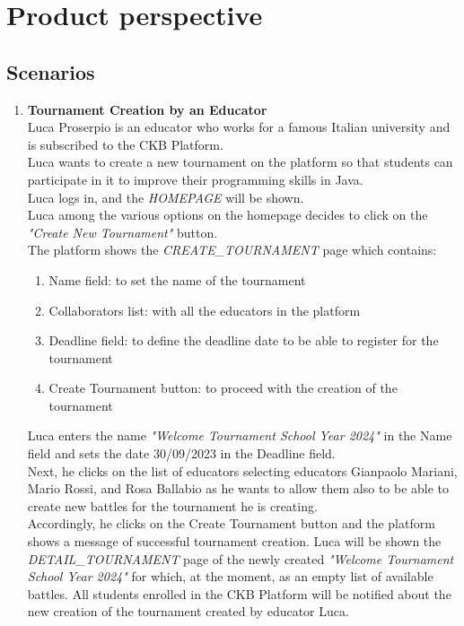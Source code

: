 \section{Product perspective}
\subsection{Scenarios}

\begin{enumerate}
      \item \textbf{Tournament Creation by an Educator}\\
    	Luca Proserpio is an educator who works for a famous Italian university and is subscribed to the CKB Platform.\\
    	Luca wants to create a new tournament on the platform so that students can participate in it to improve their programming skills in Java.\\
		Luca logs in, and the \emph{HOMEPAGE} will be shown.\\
		Luca among the various options on the homepage decides to click on the \emph{"Create New Tournament"} button. \\
		The platform shows the \emph{CREATE\_TOURNAMENT} page which contains:
		
		\begin{enumerate}
			\item Name field: to set the name of the tournament 
			\item Collaborators list: with all the educators in the platform
			\item Deadline field: to define the deadline date to be able to register for the tournament
			\item Create Tournament button: to proceed with the creation of the tournament
		\end{enumerate}
		
		Luca enters the name \emph{"Welcome Tournament School Year 2024"} in the Name field and sets the date 30/09/2023 in the Deadline field.\\
		Next, he clicks on the list of educators selecting educators Gianpaolo Mariani, Mario Rossi, and Rosa Ballabio as he wants to allow them also to be able to create new
		battles for the tournament he is creating.\\
		Accordingly, he clicks on the Create Tournament button and the platform shows a message of successful tournament creation.
		Luca will be shown the \emph{DETAIL\_TOURNAMENT} page of the newly created \emph{"Welcome Tournament School Year 2024"} for which, at the moment, as an empty list of
		available
		battles.
		All students enrolled in the CKB Platform will be notified about the new creation of the tournament created by educator Luca.



\end{enumerate}
